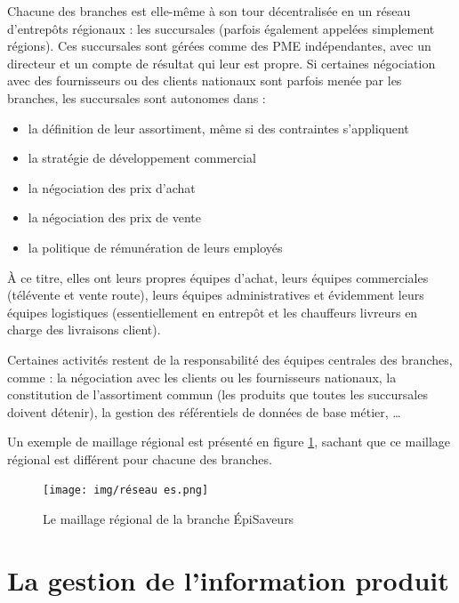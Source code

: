             Chacune des branches est elle-même à son tour décentralisée en un réseau d'entrepôts régionaux : les succursales (parfois également appelées simplement \og régions\fg).
            Ces succursales sont gérées comme des PME indépendantes, avec un directeur et un compte de résultat qui leur est propre.
            Si certaines négociation avec des fournisseurs ou des clients nationaux sont parfois menée par les branches, les succursales sont autonomes dans :
            \begin{itemize}
                \item{la définition de leur assortiment, même si des contraintes s'appliquent}
                \item{la stratégie de développement commercial}
                \item{la négociation des prix d'achat}
                \item{la négociation des prix de vente}
                \item{la politique de rémunération de leurs employés}
            \end{itemize}
            
            \`{A} ce titre, elles ont leurs propres équipes d'achat, leurs équipes commerciales (télévente et vente route), leurs équipes administratives et évidemment leurs équipes logistiques (essentiellement en entrepôt et les chauffeurs livreurs en charge des livraisons client).

            Certaines activités restent de la responsabilité des équipes centrales des branches, comme : la négociation avec les clients ou les fournisseurs nationaux, la constitution de l'assortiment commun (les produits que toutes les succursales doivent détenir), la gestion des référentiels de données de base métier, \dots
            
            Un exemple de maillage régional est présenté en figure \ref{fig:reseau_es}, sachant que ce maillage régional est différent pour chacune des branches.
            \begin{figure}[htpb]
                \begin{center}
                \texttt{[image: img/réseau es.png]}
                \end{center}
                \caption{Le maillage régional de la branche \'{E}piSaveurs}
                \label{fig:reseau_es}
            \end{figure}


    \chapter{La gestion de l'information produit}
    
